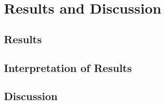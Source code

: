 \chapter{Results and Discussion}
\label{chap:kapitel5}

	\section{Results}
	\label{sec:results}



	\section{Interpretation of Results}
	\label{sec:interpretation-of-results}
	
	
	
	
	
	
	\section{Discussion} %
	\label{sec:doscussion}
	
	
	
	








